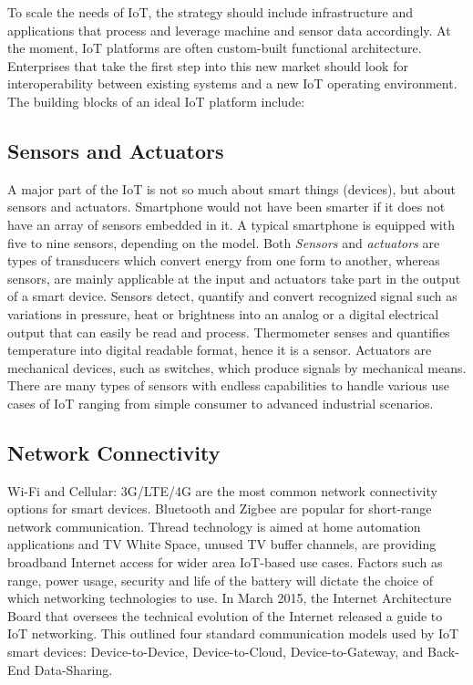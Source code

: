 \documentclass[sigconf]{acmart}
\begin{document}
	To scale the needs of IoT, the strategy should include infrastructure and applications that process and leverage machine and sensor data accordingly. At the moment, IoT platforms are often custom-built functional architecture. Enterprises that take the first step into this new market should look for interoperability between existing systems and a new IoT operating environment. The building blocks of an ideal IoT platform include:
	
	\subsection{Sensors and Actuators}
	A major part of the IoT is not so much about smart things (devices), but about sensors and actuators. Smartphone would not have been smarter if it does not have an array of sensors embedded in it. A typical smartphone is equipped with five to nine sensors, depending on the model. Both {\em Sensors} and  {\em actuators} are types of transducers which convert energy from one form to another, whereas sensors, are mainly applicable at the input and actuators take part in the output of a smart device\cite{wiley-book}. Sensors detect, quantify and convert recognized signal such as variations in pressure, heat or brightness into an analog or a digital electrical output that can easily be read and process. Thermometer senses and quantifies temperature into digital readable format, hence it is a sensor. Actuators are mechanical devices, such as switches, which produce signals by mechanical means. There are many types of sensors with endless capabilities to handle various use cases of IoT ranging from 
	simple consumer to advanced industrial scenarios.	
	
	
	\subsection{Network Connectivity}
	Wi-Fi and Cellular: 3G/LTE/4G are the most common network connectivity options for smart devices. Bluetooth and Zigbee are popular for short-range network communication. Thread technology is aimed at home automation applications and TV White Space, unused TV buffer channels, are providing broadband Internet access for wider area IoT-based use cases. Factors such as range, power usage, security and life of the battery will dictate the choice of which networking technologies to use. In March 2015, the Internet Architecture Board that oversees the technical evolution of the Internet released a guide to IoT networking. This outlined four standard communication models used by IoT smart devices: Device-to-Device, Device-to-Cloud, Device-to-Gateway, and Back-End Data-Sharing\cite{internet-society}.
	
\end{document}
